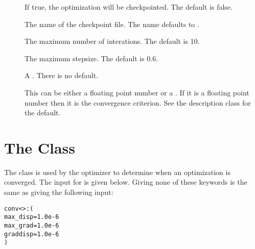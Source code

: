\begin{description}
  \item[] If true, the optimization will be checkpointed.
     The default is false.

  \item[] The name of the checkpoint file.
     The name defaults to .

  \item[] The maximum number of interations.
     The default is 10.

  \item[] The maximum stepsize.  The default is 0.6.

  \item[] A 
     .  There is no default.

  \item[] This can be either a floating point number or
     a  .  If it is a
     floating point number then it is the convergence criterion.  See the
     description  class for the default.

\end{description}


\section{The  Class}\label{Convergence}

The  class is used by the optimizer to determine
when an optimization is converged.  The  input for
 is given below.  Giving none of these keywords 
is the same as giving the following input:
\begin{alltt}
  conv<>: (
    max_disp = 1.0e-6
    max_grad = 1.0e-6
    graddisp = 1.0e-6
  )
\end{alltt}

